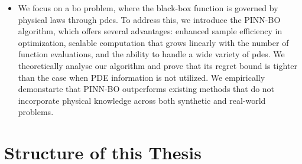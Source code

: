 \begin{itemize}
    \item We focus on a \ac{bo} problem, where the black-box function is governed by physical laws through \acp{pde}. To address this, we introduce the PINN-BO algorithm, which offers several advantages: enhanced sample efficiency in optimization, scalable computation that grows linearly with the number of function evaluations, and the ability to handle a wide variety of \acp{pde}. We theoretically analyse our algorithm and prove that its regret bound is tighter than the case when PDE information is not utilized. We empirically demonstarte that PINN-BO outperforms existing methods that do not incorporate physical knowledge across both synthetic and real-world problems. 
\end{itemize}

\section{Structure of this Thesis}
